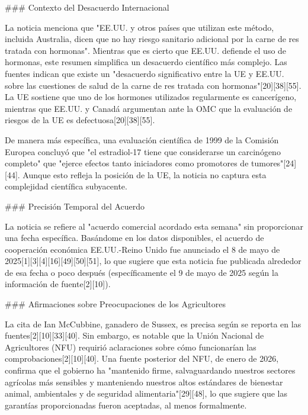 \documentclass[10pt,a4paper]{article}
\begin{document}
\par\medskip
\#\#\# Contexto del Desacuerdo Internacional
\par\medskip
La noticia menciona que "EE.UU. y otros pa\'{i}ses que utilizan este m\'{e}todo, incluida Australia, dicen que no hay riesgo sanitario adicional por la carne de res tratada con hormonas". Mientras que es cierto que EE.UU. defiende el uso de hormonas, este resumen simplifica un desacuerdo cient\'{i}fico m\'{a}s complejo. Las fuentes indican que existe un "desacuerdo significativo entre la UE y EE.UU. sobre las cuestiones de salud de la carne de res tratada con hormonas"[20][38][55]. La UE sostiene que uno de los hormones utilizados regularmente es cancer\'{i}geno, mientras que EE.UU. y Canad\'{a} argumentan ante la OMC que la evaluaci\'{o}n de riesgos de la UE es defectuosa[20][38][55].
\par\medskip
De manera m\'{a}s espec\'{i}fica, una evaluaci\'{o}n cient\'{i}fica de 1999 de la Comisi\'{o}n Europea concluy\'{o} que "el estradiol-17 tiene que considerarse un carcin\'{o}geno completo" que "ejerce efectos tanto iniciadores como promotores de tumores"[24][44]. Aunque esto refleja la posici\'{o}n de la UE, la noticia no captura esta complejidad cient\'{i}fica subyacente.
\par\medskip
\#\#\# Precisi\'{o}n Temporal del Acuerdo
\par\medskip
La noticia se refiere al "acuerdo comercial acordado esta semana" sin proporcionar una fecha espec\'{i}fica. Bas\'{a}ndome en los datos disponibles, el acuerdo de cooperaci\'{o}n econ\'{o}mica EE.UU.-Reino Unido fue anunciado el 8 de mayo de 2025[1][3][4][16][49][50][51], lo que sugiere que esta noticia fue publicada alrededor de esa fecha o poco despu\'{e}s (espec\'{i}ficamente el 9 de mayo de 2025 seg\'{u}n la informaci\'{o}n de fuente[2][10]).
\par\medskip
\#\#\# Afirmaciones sobre Preocupaciones de los Agricultores
\par\medskip
La cita de Ian McCubbine, ganadero de Sussex, es precisa seg\'{u}n se reporta en las fuentes[2][10][33][40]. Sin embargo, es notable que la Uni\'{o}n Nacional de Agricultores (NFU) requiri\'{o} aclaraciones sobre c\'{o}mo funcionar\'{i}an las comprobaciones[2][10][40]. Una fuente posterior del NFU, de enero de 2026, confirma que el gobierno ha "mantenido firme, salvaguardando nuestros sectores agr\'{i}colas m\'{a}s sensibles y manteniendo nuestros altos est\'{a}ndares de bienestar animal, ambientales y de seguridad alimentaria"[29][48], lo que sugiere que las garant\'{i}as proporcionadas fueron aceptadas, al menos formalmente.
\end{document}
